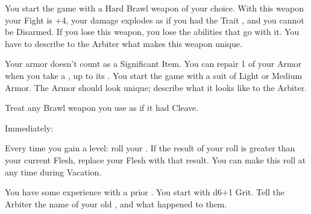 {    

    You start the game with a Hard Brawl weapon of your choice.  With this weapon  your Fight \RO is +4, your damage explodes as if you had the Trait , and you cannot be Disarmed. If you lose this weapon, you lose the abilities that go with it.  You have to describe to the Arbiter what makes this weapon unique.


    Your armor doesn't count as a Significant Item.  You can repair 1 \UD of your Armor when you take a , 
    up to its \MAX \UD.   You start the game with a suit of Light or Medium Armor.  The Armor should look unique; describe what it looks like to the Arbiter.

    
    Treat any Brawl weapon you use as if it had Cleave.


    Immediately:

    Every time you gain a level:  roll your \VIG.  If the result of your roll is greater than your current Flesh, replace your Flesh with that result.  You can make this roll at any time during Vacation.



    You have some experience with a prior .  You start with d6+1 Grit.  Tell the Arbiter the name of your old , and what happened to them.





}
